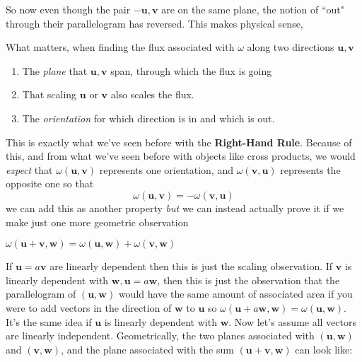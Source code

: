 \documentclass[../master.tex]{subfiles}
\begin{document}
	So now even though the pair $-\mathbf u, \mathbf v$ are on the same plane, the notion of ``out" through their parallelogram has reversed. This makes physical sense, 
	\begin{concept}
		What matters, when finding the flux associated with $\omega$ along two directions $\mathbf u, \mathbf v$
		\begin{enumerate}
			\item The \emph{plane} that $\mathbf u, \mathbf v$ span, through which the flux is going
			\item That scaling $\mathbf u$ or $\mathbf v$ also scales the flux.
			\item The \emph{orientation} for which direction is in and which is out.
		\end{enumerate}
	\end{concept}
	This is exactly what we've seen before with the \textbf{Right-Hand Rule}. Because of this, and from what we've seen before with objects like cross products, we would \emph{expect} that $\omega(\mathbf u, \mathbf v)$ represents one orientation, and $\omega(\mathbf v, \mathbf u)$ represents the opposite one so that 
	 \begin{equation*}
	 	\omega(\mathbf u, \mathbf v) = -\omega(\mathbf v, \mathbf u)
	 \end{equation*}
	we can add this as another property \emph{but} we can instead actually prove it if we make just one more geometric observation
	\begin{obs}
		$\omega(\mathbf u+\mathbf v, \mathbf w) = \omega(\mathbf u, \mathbf w) + \omega(\mathbf v, \mathbf w)$
	\end{obs}
	If $\mathbf u = a \mathbf v$ are linearly dependent then this is just the scaling observation. If $\mathbf v$ is linearly dependent with $\mathbf w, \mathbf u = a \mathbf w$, then this is just the observation that the parallelogram of $(\mathbf u, \mathbf w)$ would have the same amount of associated area if you were to add vectors in the direction of $\mathbf w$ to $\mathbf u$ so $\omega(\mathbf u + a \mathbf w, \mathbf w) = \omega(\mathbf u, \mathbf w)$. It's the same idea if $\mathbf u$ is linearly dependent with $\mathbf w$. Now let's assume all vectors are linearly independent. Geometrically, the two planes associated with $(\mathbf u,\mathbf w)$ and $(\mathbf v,\mathbf w)$, and the plane associated with the sum $(\mathbf u + \mathbf v, \mathbf w)$ can look like:
	
\end{document}
